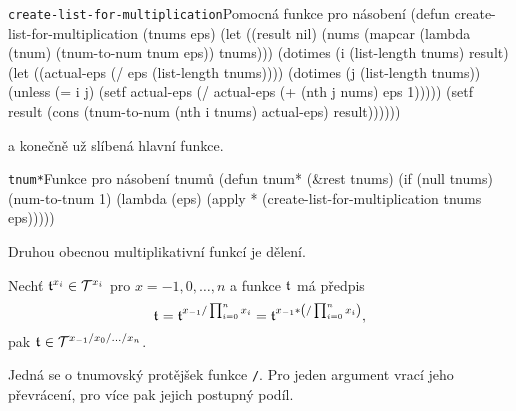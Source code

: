 \begin{lispcode}{\texttt{create-list-for-multiplication}}{Pomocná fun\-kce pro násobení}
(\textcolor{funkcionalni}{defun} \textcolor{pojmenovan}{create-list-for-multiplication} (tnums eps)
  (\textcolor{vedlejsi}{let} ((result nil)
      (nums
        (\textcolor{funkcionalni}{mapcar} (\textcolor{funkcionalni}{lambda} (tnum) (\textcolor{moje}{tnum-to-num} tnum eps)) tnums)))
    (\textcolor{funkcionalni}{dotimes} (i (\textcolor{funkcionalni}{list-length} tnums) result)
      (\textcolor{vedlejsi}{let} ((actual-eps (\textcolor{matematicke}{/} eps (\textcolor{funkcionalni}{list-length} tnums))))
        (\textcolor{funkcionalni}{dotimes} (j (\textcolor{funkcionalni}{list-length} tnums))
          (\textcolor{funkcionalni}{unless} (\textcolor{matematicke}{=} i j)
            (\textcolor{vedlejsi}{setf} actual-eps (\textcolor{matematicke}{/} actual-eps
              (\textcolor{matematicke}{+} (\textcolor{funkcionalni}{nth} j nums) eps 1)))))
        (\textcolor{vedlejsi}{setf} result (cons
          (\textcolor{moje}{tnum-to-num} (\textcolor{funkcionalni}{nth} i tnums) actual-eps) result))))))
\end{lispcode}

a konečně už slíbená hlavní funkce.

\begin{lispcode}{\texttt{tnum*}}{Funkce pro násobení tnumů}
(\textcolor{funkcionalni}{defun} \textcolor{pojmenovan}{tnum*} (&rest tnums)
  (\textcolor{funkcionalni}{if} (\textcolor{funkcionalni}{null} tnums)
    (\textcolor{moje}{num-to-tnum} 1)
    (\textcolor{funkcionalni}{lambda} (eps)
      (\textcolor{funkcionalni}{apply} \textquotesingle\textcolor{moje}{*} (\textcolor{moje}{create-list-for-multiplication} tnums eps)))))
\end{lispcode}

Druhou obecnou multiplikativní funkcí je dělení.

\begin{fact}
Nechť $\mathfrak{t}^{x_i}\in\mathcal{T}^{x_i}$ pro $x=-1,0,\ldots ,n$ a funkce $\mathfrak{t}^{}$ má předpis
\begin{equation}
\mathfrak{t}^{}=\mathfrak{t}^{x_{-1}/\prod_{i=0}^nx_i}=\mathfrak{t}^{x_{-1}*\left(/\prod_{i=0}^nx_i\right)},
\end{equation}
pak $\mathfrak{t}^{}\in\mathcal{T}^{x_{-1}/x_0/\ldots /x_n}$.
\end{fact}

Jedná se o tnumovský protějšek funkce \texttt{/}. Pro jeden argument vrací jeho převrácení, pro více pak jejich postupný podíl.

